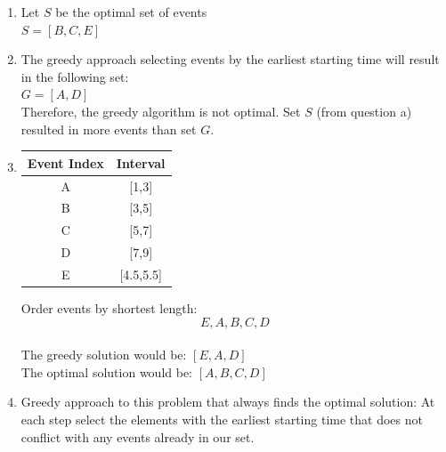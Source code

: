 \documentclass[9pt]{article}
\begin{document}
\begin{enumerate}
    \item 
        Let $S$ be the optimal set of events\\
        $S=[B,C,E]$
    \item
        The greedy approach selecting events by the earliest starting time will result in the following set:\\
        $G=[A,D]$\\
        Therefore, the greedy algorithm is not optimal. Set $S$ (from question a) resulted in more events than set $G$.
    \item \phantom{.}
        \begin{center}
        \begin{tabular}{c|c}
        Event Index & Interval \\ \hline
        A & [1,3] \\ 
        B & [3,5] \\
        C & [5,7] \\
        D & [7,9] \\
        E & [4.5,5.5]\\
        \end{tabular}
        \end{center}
        Order events by shortest length:\\
        $$E,A,B,C,D$$\\
        The greedy solution would be: $[E,A,D]$\\
        The optimal solution would be: $[A,B,C,D]$
    \item
        Greedy approach to this problem that always finds the optimal solution: At each step select the elements with the earliest starting time that does not conflict with any events already in our set.
\end{enumerate}


\fi
\newpage



\vspace{5mm}
\end{document}
